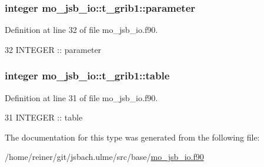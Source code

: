 \subsubsection[{parameter}]{\setlength{\rightskip}{0pt plus 5cm}integer mo\+\_\+jsb\+\_\+io\+::t\+\_\+grib1\+::parameter}\label{structmo__jsb__io_1_1t__grib1_aa164650bd0115ed067cb2b0a78470309}


Definition at line 32 of file mo\+\_\+jsb\+\_\+io.\+f90.


\begin{DoxyCode}
32     \textcolor{keywordtype}{INTEGER} :: parameter
\end{DoxyCode}
\hypertarget{structmo__jsb__io_1_1t__grib1_a8a845bcc6a7706bff62b3f05c368754a}{}
\subsubsection[{table}]{\setlength{\rightskip}{0pt plus 5cm}integer mo\+\_\+jsb\+\_\+io\+::t\+\_\+grib1\+::table}\label{structmo__jsb__io_1_1t__grib1_a8a845bcc6a7706bff62b3f05c368754a}


Definition at line 31 of file mo\+\_\+jsb\+\_\+io.\+f90.


\begin{DoxyCode}
31     \textcolor{keywordtype}{INTEGER} :: table
\end{DoxyCode}


The documentation for this type was generated from the following file\+:\begin{DoxyCompactItemize}
\item 
/home/reiner/git/jsbach.\+ulme/src/base/\hyperlink{mo__jsb__io_8f90}{mo\+\_\+jsb\+\_\+io.\+f90}\end{DoxyCompactItemize}
